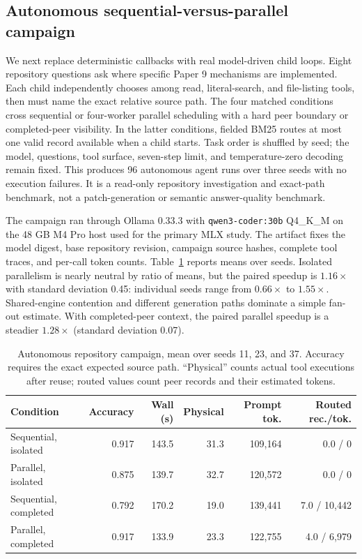 \documentclass[11pt]{article}
\begin{document}
\subsection{Autonomous sequential-versus-parallel campaign}

We next replace deterministic callbacks with real model-driven child loops.
Eight repository questions ask where specific Paper 9 mechanisms are
implemented. Each child independently chooses among read, literal-search, and
file-listing tools, then must name the exact relative source path. The four
matched conditions cross sequential or four-worker parallel scheduling with a
hard peer boundary or completed-peer visibility. In the latter conditions,
fielded BM25 routes at most one valid record available when a child starts.
Task order is shuffled by seed; the model, questions, tool surface, seven-step
limit, and temperature-zero decoding remain fixed. This produces 96 autonomous
agent runs over three seeds with no execution failures. It is a read-only
repository investigation and exact-path benchmark, not a patch-generation or
semantic answer-quality benchmark.

The campaign ran through Ollama 0.33.3 with
\texttt{qwen3-coder:30b} Q4\_K\_M on the 48 GB M4 Pro host used for the primary
MLX study. The artifact fixes the model digest, base repository revision,
campaign source hashes, complete tool traces, and per-call token counts.
Table~\ref{tab:autonomous-campaign} reports means over seeds. Isolated
parallelism is nearly neutral by ratio of means, but the paired speedup is
$1.16\times$ with standard deviation 0.45: individual seeds range from
$0.66\times$ to $1.55\times$. Shared-engine contention and different generation
paths dominate a simple fan-out estimate. With completed-peer context, the
paired parallel speedup is a steadier $1.28\times$ (standard deviation 0.07).

\begin{table}[H]
\centering
\small
\caption{Autonomous repository campaign, mean over seeds 11, 23, and 37.
Accuracy requires the exact expected source path. ``Physical'' counts actual
tool executions after reuse; routed values count peer records and their
estimated tokens.}
\label{tab:autonomous-campaign}
\begin{tabular}{lrrrrr}
\toprule
Condition & Accuracy & Wall (s) & Physical & Prompt tok. & Routed rec./tok. \\
\midrule
Sequential, isolated & 0.917 & 143.5 & 31.3 & 109,164 & 0.0 / 0 \\
Parallel, isolated & 0.875 & 139.7 & 32.7 & 120,572 & 0.0 / 0 \\
Sequential, completed & 0.792 & 170.2 & 19.0 & 139,441 & 7.0 / 10,442 \\
Parallel, completed & 0.917 & 133.9 & 23.3 & 122,755 & 4.0 / 6,979 \\
\bottomrule
\end{tabular}
\end{table}
\end{document}

